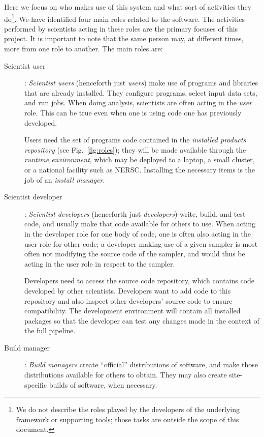 \documentclass[draftmode,draftwater]{memarticle}
\newcommand{\cosmosis}{\name{CosmoSIS}\xspace}
\begin{document}
Here we focus on who makes use of this system and what sort of
activities they do\footnote{We do not describe the roles played by the
  developers of the underlying framework or supporting tools; those
  tasks are outside the scope of this document.}. We have identified
four main roles related to the \cosmosis software. The activities
performed by scientists acting in these roles are the primary focuses of
this project. It is important to note that the same person may, at
different times, more from one role to another. The main roles are:
\begin{description}

\item[Scientist user]: \emph{Scientist users} (henceforth just
  \emph{users}) make use of programs and libraries that are already
  installed. They configure programs, select input data sets, and run
  jobs. When doing analysis, scientists are often acting in the
  \emph{user} role. This can be true even when one is using code one has
  previously developed.


  Users need the set of programs code contained in the \emph{installed
    products repository} (see Fig.~\ref{fig:roles}); they will be made
  available through the \emph{runtime environment}, which may be
  deployed to a laptop, a small cluster, or a national facility such as
  NERSC. Installing the necessary items is the job of an \emph{install
    manager}.

\item[Scientist developer]: \emph{Scientist developers} (henceforth just
  \emph{developers}) write, build, and test code, and usually make that
  code available for others to use. When acting in the developer role
  for one body of code, one is often also acting in the user role for
  other code; \eg a developer making use of a given sampler is most
  often not modifying the source code of the sampler, and would thus be
  acting in the user role in respect to the sampler.

Developers need to access the {source code repository}, which contains code developed by other scientists. Developers want to add code to this repository and also inspect other developers' source code to ensure compatibility. The {development environment} will contain all installed packages so that the developer can test any changes made in the context of the full pipeline.

\item[Build manager]: \emph{Build managers} create ``official''
  distributions of software, and make those distributions available for
  others to obtain. They may also create site-specific builds of
  software, when necessary. %



\end{description}
\end{document}
